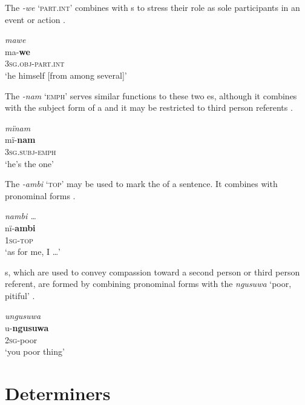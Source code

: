 The   \textit{{}-we} ‘\textsc{part.int}’ combines with  s to stress their role as sole participants in an event or action .

\ea%
    \label{ex:overview:40}
    \textit{mawe}\\
\gll    ma-\textbf{we}\\
    3\textsc{sg.obj-part.int}\\
\glt    ‘he himself [from among several]’
\z

The   \textit{{}-nam} ‘\textsc{emph’} serves similar functions to these two  es, although it combines with the subject form of a  and it may be restricted to third person referents .

\ea%
    \label{ex:overview:41}
    \textit{mïnam}\\
\gll    mï-\textbf{nam}\\
    3\textsc{sg.subj-emph}\\
\glt    ‘he’s the one’
\z

The   \textit{{}-ambi} ‘\textsc{top}’ may be used to mark the  of a sentence. It combines with  pronominal forms .

\ea%
\label{ex:overview:42}
    \textit{nambi …}\\
\gll    nï-\textbf{ambi}\\
    1\textsc{sg-top}\\
\glt    ‘as for me, I …’
\z

s, which are used to convey compassion toward a second person or third person referent, are formed by combining  pronominal forms with the  \textit{ngusuwa} ‘poor, pitiful’ .


\newpage

\ea%
    \label{ex:overview:43}
    \textit{ungusuwa}\\
\gll    u-\textbf{ngusuwa}\\
 2\textsc{sg-}poor\\
\glt    ‘you poor thing’
\z

\section{Determiners}\label{sec:overview:2.7}

